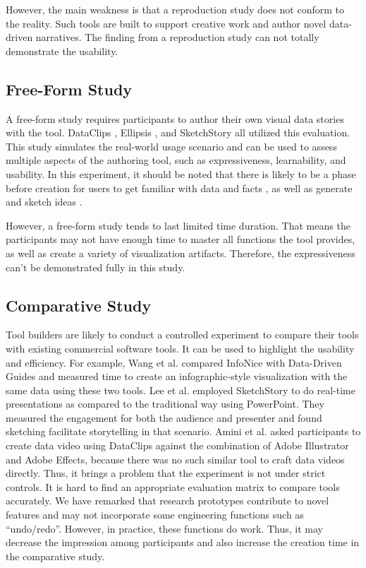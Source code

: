 However, the main weakness is that a reproduction study does not conform to the reality. Such tools are built to support creative work and author novel data-driven narratives. The finding from a reproduction study can not totally demonstrate the usability.

\subsection{Free-Form Study}
A free-form study requires participants to author their own visual data stories with the tool. DataClips \cite{Amini2017}, Ellipsis \cite{Satyanarayan2014}, and SketchStory \cite{Lee2013} all utilized this evaluation. This study simulates the real-world usage scenario and can be used to assess multiple aspects of the authoring tool, such as expressiveness, learnability, and usability. In this experiment, it should be noted that there is likely to be a phase before creation for users to get familiar with data and facts \cite{Amini2017}, as well as generate and sketch ideas \cite{Lee2013}. 

However, a free-form study tends to last limited time duration. That means the participants may not have enough time to master all functions the tool provides, as well as create a variety of visualization artifacts. Therefore, the expressiveness can’t be demonstrated fully in this study.

\subsection{Comparative Study}
Tool builders are likely to conduct a controlled experiment to compare their tools with existing commercial software tools. It can be used to highlight the usability and efficiency. For example, Wang et al. compared InfoNice \cite{Wang2018} with Data-Driven Guides \cite{Kim2017} and measured time to create an infographic-style visualization with the same data using these two tools. Lee et al. \cite{Lee2013} employed SketchStory to do real-time presentations as compared to the traditional way using PowerPoint. They measured the engagement for both the audience and presenter and found sketching facilitate storytelling in that scenario. Amini et al. \cite{Amini2017} asked participants to create data video using DataClips against the combination of Adobe Illustrator and Adobe Effects, because there was no such similar tool to craft data videos directly. Thus, it brings a problem that the experiment is not under strict controls. It is hard to find an appropriate evaluation matrix to compare tools accurately. We have remarked that research prototypes contribute to novel features and may not incorporate some engineering functions such as “undo/redo”. However, in practice, these functions do work. Thus, it may decrease the impression among participants and also increase the creation time in the comparative study. 

